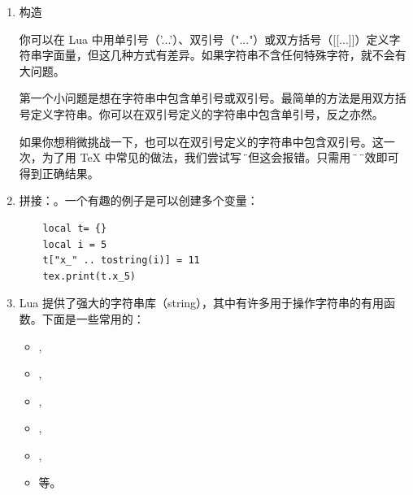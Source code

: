 \begin{enumerate}[label=(\alph*)]
  \item 构造

 你可以在 Lua 中用单引号（'...'）、双引号（"..."）或双方括号（[[...]]）定义字符串字面量，但这几种方式有差异。如果字符串不含任何特殊字符，就不会有大问题。


第一个小问题是想在字符串中包含单引号或双引号。最简单的方法是用双方括号定义字符串。你可以在双引号定义的字符串中包含单引号，反之亦然。

\begin{tkzexample}[latex=.4\textwidth]
\end{tkzexample}

如果你想稍微挑战一下，也可以在双引号定义的字符串中包含双引号。这一次，为了用 \TeX{} 中常见的做法，我们尝试写 \"，但这会报错。只需用 \string\" 使 \" 失效即可得到正确结果。

\begin{tkzexample}[latex=.4\textwidth]
\end{tkzexample}



\item 拼接：。一个有趣的例子是可以创建多个变量：
\begin{mybox}
  \begin{verbatim}
    local t= {}
    local i = 5
    t["x_" .. tostring(i)] = 11
    tex.print(t.x_5)
  \end{verbatim}

\end{mybox}


\item Lua 提供了强大的字符串库（string），其中有许多用于操作字符串的有用函数。下面是一些常用的：

\begin{itemize}

\item {},
\item {},

\item {},

\item {},

\item {},

\item {} 等。
\end{itemize}


\end{enumerate}
